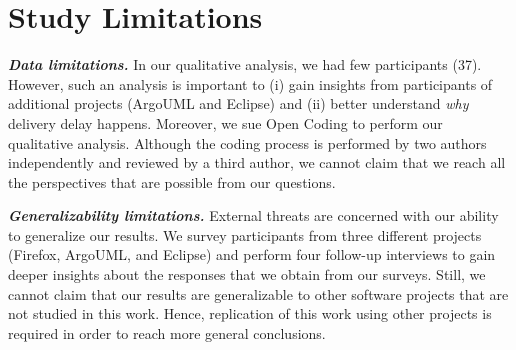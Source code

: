 \section{Study Limitations} \label{ch6:threats}

\textbf{\textit{Data limitations.}} In our qualitative analysis, we had few
participants (37). However, such an analysis is important to (i) gain insights
from participants of additional projects (ArgoUML and Eclipse) and (ii) better
understand {\em why} delivery delay happens. Moreover, we sue Open Coding to
perform our qualitative analysis. Although the coding process is performed by
two authors independently and reviewed by a third author, we cannot claim that
we reach all the perspectives that are possible from our questions.

\textbf{\textit{Generalizability limitations.}} External threats are concerned
with our ability to generalize our results. We survey participants from three
different projects (Firefox, ArgoUML, and Eclipse) and perform four follow-up
interviews to gain deeper insights about the responses that we obtain from our
surveys.  Still, we cannot claim that our results are generalizable to other
software projects that are not studied in this work.  Hence, replication of this
work using other projects is required in order to reach more general
conclusions.

